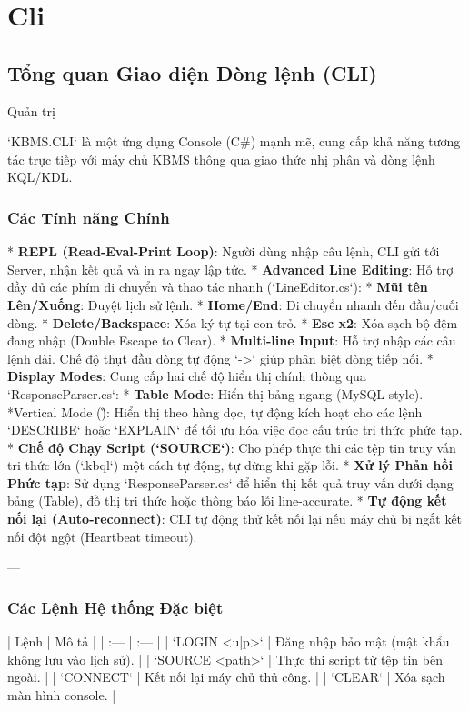 \chapter{Cli}
\section{Tổng quan Giao diện Dòng lệnh (CLI)}
Quản trị

`KBMS.CLI` là một ứng dụng Console (C\#) mạnh mẽ, cung cấp khả năng tương tác trực tiếp với máy chủ KBMS thông qua giao thức nhị phân và dòng lệnh KQL/KDL.

\subsection{Các Tính năng Chính}

*   \textbf{REPL (Read-Eval-Print Loop)}: Người dùng nhập câu lệnh, CLI gửi tới Server, nhận kết quả và in ra ngay lập tức.
*   \textbf{Advanced Line Editing}: Hỗ trợ đầy đủ các phím di chuyển và thao tác nhanh (`LineEditor.cs`):
    *   \textbf{Mũi tên Lên/Xuống}: Duyệt lịch sử lệnh.
    *   \textbf{Home/End}: Di chuyển nhanh đến đầu/cuối dòng.
    *   \textbf{Delete/Backspace}: Xóa ký tự tại con trỏ.
    *   \textbf{Esc x2}: Xóa sạch bộ đệm đang nhập (Double Escape to Clear).
*   \textbf{Multi-line Input}: Hỗ trợ nhập các câu lệnh dài. Chế độ thụt đầu dòng tự động `->` giúp phân biệt dòng tiếp nối.
*   \textbf{Display Modes}: Cung cấp hai chế độ hiển thị chính thông qua `ResponseParser.cs`:
    *   \textbf{Table Mode}: Hiển thị bảng ngang (MySQL style).
    \textit{   }*Vertical Mode (\G)\textit{}: Hiển thị theo hàng dọc, tự động kích hoạt cho các lệnh `DESCRIBE` hoặc `EXPLAIN` để tối ưu hóa việc đọc cấu trúc tri thức phức tạp.
*   \textbf{Chế độ Chạy Script (`SOURCE`)}: Cho phép thực thi các tệp tin truy vấn tri thức lớn (`.kbql`) một cách tự động, tự dừng khi gặp lỗi.
*   \textbf{Xử lý Phản hồi Phức tạp}: Sử dụng `ResponseParser.cs` để hiển thị kết quả truy vấn dưới dạng bảng (Table), đồ thị tri thức hoặc thông báo lỗi line-accurate.
*   \textbf{Tự động kết nối lại (Auto-reconnect)}: CLI tự động thử kết nối lại nếu máy chủ bị ngắt kết nối đột ngột (Heartbeat timeout).

---

\subsection{Các Lệnh Hệ thống Đặc biệt}

| Lệnh | Mô tả |
| :--- | :--- |
| `LOGIN <u|p>` | Đăng nhập bảo mật (mật khẩu không lưu vào lịch sử). |
| `SOURCE <path>` | Thực thi script từ tệp tin bên ngoài. |
| `CONNECT` | Kết nối lại máy chủ thủ công. |
| `CLEAR` | Xóa sạch màn hình console. |


